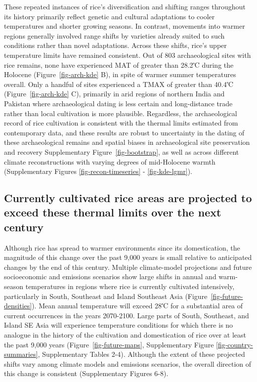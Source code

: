 \documentclass[
  letterpaper,
  DIV=11,
  numbers=noendperiod]{scrartcl}
\begin{document}
These repeated instances of rice's diversification and shifting ranges
throughout its history primarily reflect genetic and cultural
adaptations to cooler temperatures and shorter growing seasons. In
contrast, movements into warmer regions generally involved range shifts
by varieties already suited to such conditions rather than novel
adaptations. Across these shifts, rice's upper temperature limits have
remained consistent. Out of 803 archaeological sites with rice remains,
none have experienced MAT of greater than 28.2℃ during the Holocene
(Figure~\ref{fig-arch-kde} B), in spite of warmer summer temperatures
overall. Only a handful of sites experienced a TMAX of greater than
40.4℃ (Figure~\ref{fig-arch-kde} C), primarily in arid regions of
northern India and Pakistan where archaeological dating is less certain
and long-distance trade rather than local cultivation is more plausible.
Regardless, the archaeological record of rice cultivation is consistent
with the thermal limits estimated from contemporary data, and these
results are robust to uncertainty in the dating of these archaeological
remains and spatial biases in archaeological site preservation and
recovery Supplementary Figure~\ref{fig-bootstrap}, as well as across
different climate reconstructions with varying degrees of mid-Holocene
warmth (Supplementary Figures \ref{fig-recon-timeseries} -
\ref{fig-kde-lgmr}).

\subsection{Currently cultivated rice areas are projected to exceed
these thermal limits over the next
century}\label{currently-cultivated-rice-areas-are-projected-to-exceed-these-thermal-limits-over-the-next-century}

Although rice has spread to warmer environments since its domestication,
the magnitude of this change over the past 9,000 years is small relative
to anticipated changes by the end of this century. Multiple
climate-model projections and future socioeconomic and emissions
scenarios show large shifts in annual and warm-season temperatures in
regions where rice is currently cultivated intensively, particularly in
South, Southeast and Island Southeast Asia
(Figure~\ref{fig-future-densities}). Mean annual temperature will exceed
28℃ for a substantial area of current occurrences in the years
2070-2100. Large parts of South, Southeast, and Island SE Asia will
experience temperature conditions for which there is no analogue in the
history of the cultivation and domestication of rice over at least the
past 9,000 years (Figure~\ref{fig-future-maps}, Supplementary Figure
\ref{fig-country-summaries}, Supplementary Tables 2-4). Although the
extent of these projected shifts vary among climate models and emissions
scenarios, the overall direction of this change is consistent
(Supplementary Figures 6-8).
\end{document}
